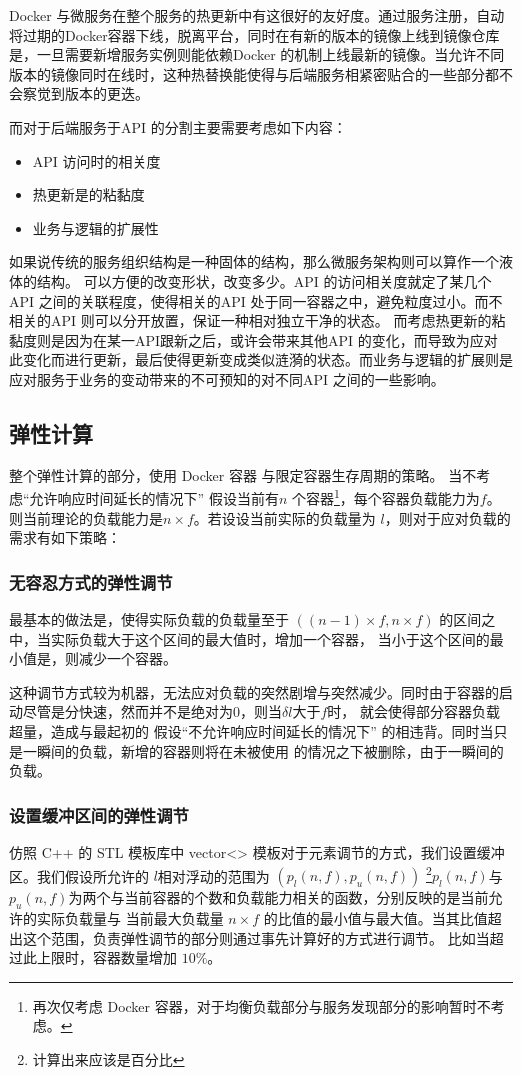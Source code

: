 Docker 与微服务在整个服务的热更新中有这很好的友好度。通过服务注册，自动将过期的Docker容器下线，脱离平台，同时在有新的版本的镜像上线到镜像仓库是，一旦需要新增服务实例则能依赖Docker 的机制上线最新的镜像。当允许不同版本的镜像同时在线时，这种热替换能使得与后端服务相紧密贴合的一些部分都不会察觉到版本的更迭。

而对于后端服务于API 的分割主要需要考虑如下内容：
\begin{itemize}
    \item API 访问时的相关度
    \item 热更新是的粘黏度
    \item 业务与逻辑的扩展性
\end{itemize}
如果说传统的服务组织结构是一种固体的结构，那么微服务架构则可以算作一个液体的结构。
可以方便的改变形状，改变多少。API 的访问相关度就定了某几个 API 之间的关联程度，使得相关的API
处于同一容器之中，避免粒度过小。而不相关的API 则可以分开放置，保证一种相对独立干净的状态。
而考虑热更新的粘黏度则是因为在某一API跟新之后，或许会带来其他API 的变化，而导致为应对
此变化而进行更新，最后使得更新变成类似涟漪的状态。而业务与逻辑的扩展则是应对服务于业务的变动带来的不可预知的对不同API 之间的一些影响。

\subsection{弹性计算}
整个弹性计算的部分，使用 Docker 容器 与限定容器生存周期的策略。
当不考虑“允许响应时间延长的情况下”
假设当前有$n$ 个容器\footnote{再次仅考虑 Docker 容器，对于均衡负载部分与服务发现部分的影响暂时不考虑。}，每个容器负载能力为$f$。
则当前理论的负载能力是$n \times f$。若设设当前实际的负载量为 $l$，则对于应对负载的需求有如下策略：
\subsubsection{无容忍方式的弹性调节}
最基本的做法是，使得实际负载的负载量至于 $((n-1) \times f,n \times f)$ 的区间之中，当实际负载大于这个区间的最大值时，增加一个容器，
当小于这个区间的最小值是，则减少一个容器。

这种调节方式较为机器，无法应对负载的突然剧增与突然减少。同时由于容器的启动尽管是分快速，然而并不是绝对为0，则当$\delta l$大于$f$时，
就会使得部分容器负载超量，造成与最起初的 假设“不允许响应时间延长的情况下” 的相违背。同时当只是一瞬间的负载，新增的容器则将在未被使用
的情况之下被删除，由于一瞬间的负载。
\subsubsection{设置缓冲区间的弹性调节}
仿照 C++ 的 STL 模板库中 vector<> 模板对于元素调节的方式，我们设置缓冲区。我们假设所允许的 $l$相对浮动的范围为 $(p_l(n,f),p_u(n,f))$
\footnote{计算出来应该是百分比}$p_l(n,f)$与$p_u(n,f)$为两个与当前容器的个数和负载能力相关的函数，分别反映的是当前允许的实际负载量与
当前最大负载量 $n \times f$ 的比值的最小值与最大值。当其比值超出这个范围，负责弹性调节的部分则通过事先计算好的方式进行调节。
比如当超过此上限时，容器数量增加 $10\%$。


